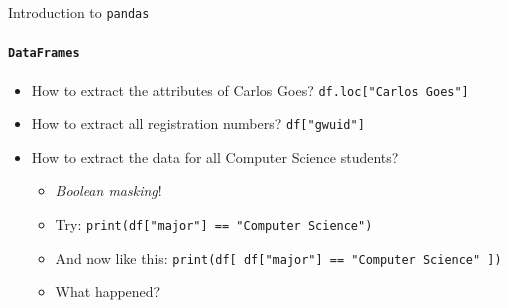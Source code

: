 \documentclass[notes,11pt, aspectratio=169, xcolor=table]{beamer}
\begin{document}
        \begin{frame}[fragile=singleslide]{Introduction to \texttt{pandas}}
        \framesubtitle{\texttt{DataFrames}}
            
             \begin{itemize}
    
                \item How to extract the attributes of Carlos Goes? \texttt{df.loc["Carlos Goes"]}

                \item How to extract all registration numbers? \texttt{df["gwuid"]}
                
                \item How to extract the data for all Computer Science students?
                
                \begin{itemize}
                    \item \textit{Boolean masking}!
                    \item Try: \texttt{print(df["major"] == "Computer Science")}
                    \item And now like this: \texttt{print(df[ df["major"] == "Computer Science" ])}
                    \item What happened?
                \end{itemize}
        
            \end{itemize}             

        \end{frame}    
    
\end{document}
